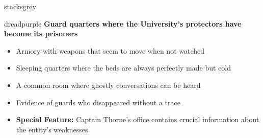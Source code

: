 \documentclass[11pt]{article}
\begin{document}
\begin{campaignsection}{stacksgrey}
\begin{mechanicbox}{dreadpurple}
\textbf{Guard quarters where the University's protectors have become its prisoners}
\begin{itemize}
    \item Armory with weapons that seem to move when not watched
    \item Sleeping quarters where the beds are always perfectly made but cold
    \item A common room where ghostly conversations can be heard
    \item Evidence of guards who disappeared without a trace
    \item \textbf{Special Feature:} Captain Thorne's office contains crucial information about the entity's weaknesses
\end{itemize}
\end{mechanicbox}
\end{campaignsection}

\newpage
\end{document}
